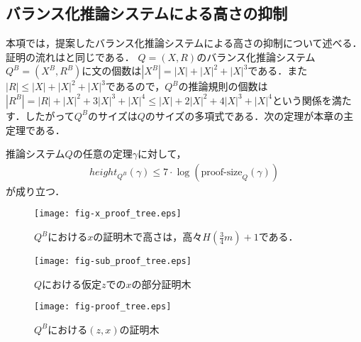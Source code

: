 

\subsection{バランス化推論システムによる高さの抑制}
本項では，提案したバランス化推論システムによる高さの抑制について述べる．証明の流れは\cite{miyano-parallel1993}と同じである．
$Q=(X,R)$のバランス化推論システム$Q^{B}=(X^{B},R^{B})$に文の個数は$|X^{B}|=|X|+|X|^2+|X|^3$である．また$|R|\leq |X|+|X|^2+|X|^3$であるので，$Q^{B}$の推論規則の個数は$|R^{B}|=|R|+|X|^2+3|X|^3+|X|^4\leq |X|+2|X|^2+4|X|^3+|X|^4$という関係を満たす．したがって$Q^B$のサイズは$Q$のサイズの多項式である．次の定理が本章の主定理である．

\begin{theorem}\label{prop:int0}
  推論システム$Q$の任意の定理$\gamma$に対して，
  \begin{eqnarray*}
    height_{Q^{B}}(\gamma)\leq 7\cdot \log(\mbox{proof-size}_{Q}(\gamma))
  \end{eqnarray*}
  が成り立つ．
\end{theorem}

  \begin{figure}[tb]
    \centering
    \texttt{[image: fig-x\_proof\_tree.eps]}
    \caption{$Q^{B}$における$x$の証明木で高さは，高々$H(\frac{3}{4}m)+1$である．}\label{fig-x_proof_tree}
    \texttt{[image: fig-sub\_proof\_tree.eps]}
    \caption{$Q$における仮定$z$での$x$の部分証明木}\label{fig:sub_proof_tree}
  \end{figure}

\begin{figure}[tb]
  \centering
  \texttt{[image: fig-proof\_tree.eps]}
  \caption{$Q^{B}$における$(z,x)$の証明木}\label{fig:proof_tree}
\end{figure}

